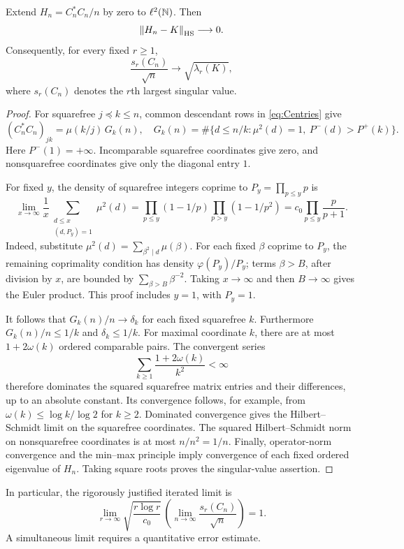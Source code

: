 \begin{proposition}\label{prop:finite}
Extend $H_n=C_n^*C_n/n$ by zero to $\ell^2(\mathbb N)$. Then
\[
 \left\lVert H_n-K\right\rVert_{\mathrm{HS}}\longrightarrow0.
\]
Consequently, for every fixed $r\ge1$,
\[
 \frac{s_r(C_n)}{\sqrt n}\longrightarrow\sqrt{\lambda_r(K)},
\]
where $s_r(C_n)$ denotes the $r$th largest singular value.
\end{proposition}
\begin{proof}
For squarefree $j\preceq k\le n$, common descendant rows in
\eqref{eq:Centries} give
\[
 (C_n^*C_n)_{jk}=\mu(k/j)\,G_k(n),
 \quad
 G_k(n)=\#\{d\le n/k:\mu^2(d)=1,\ P^-(d)>P^+(k)\}.
\]
Here $P^-(1)=+\infty$. Incomparable squarefree coordinates give zero,
and nonsquarefree coordinates give only the diagonal entry $1$.

For fixed $y$, the density of squarefree integers coprime to
$P_y=\prod_{p\le y}p$ is
\begin{equation}\label{eq:roughdensity}
 \lim_{x\to\infty}\frac1x
   \sum_{\substack{d\le x\\(d,P_y)=1}}\mu^2(d)
 =\prod_{p\le y}(1-1/p)\prod_{p>y}(1-1/p^2)
 =c_0\prod_{p\le y}\frac p{p+1}.
\end{equation}
Indeed, substitute $\mu^2(d)=\sum_{\beta^2\mid d}\mu(\beta)$.
For each fixed $\beta$ coprime to $P_y$, the remaining coprimality
condition has density $\varphi(P_y)/P_y$; terms $\beta>B$, after division
by $x$, are bounded by $\sum_{\beta>B}\beta^{-2}$.
Taking $x\to\infty$ and then $B\to\infty$ gives the Euler product.
This proof includes $y=1$, with $P_y=1$.

It follows that $G_k(n)/n\to\delta_k$ for each fixed squarefree $k$.
Furthermore $G_k(n)/n\le1/k$ and $\delta_k\le1/k$. For maximal coordinate
$k$, there are at most $1+2\omega(k)$ ordered comparable pairs.
The convergent series
\[
 \sum_{k\ge1}\frac{1+2\omega(k)}{k^2}<\infty
\]
therefore dominates the squared squarefree matrix entries and their
differences, up to an absolute constant. Its convergence follows, for
example, from $\omega(k)\le\log k/\log2$ for $k\ge2$.
Dominated convergence gives the Hilbert--Schmidt limit on the squarefree
coordinates. The squared Hilbert--Schmidt norm on nonsquarefree
coordinates is at most $n/n^2=1/n$.
Finally, operator-norm convergence and the min--max principle imply
convergence of each fixed ordered eigenvalue of $H_n$. Taking square
roots proves the singular-value assertion.
\end{proof}

In particular, the rigorously justified iterated limit is
\[
 \lim_{r\to\infty}\sqrt{\frac{r\log r}{c_0}}\,
       \left(\lim_{n\to\infty}\frac{s_r(C_n)}{\sqrt n}\right)=1.
\]
A simultaneous limit requires a quantitative error estimate.

